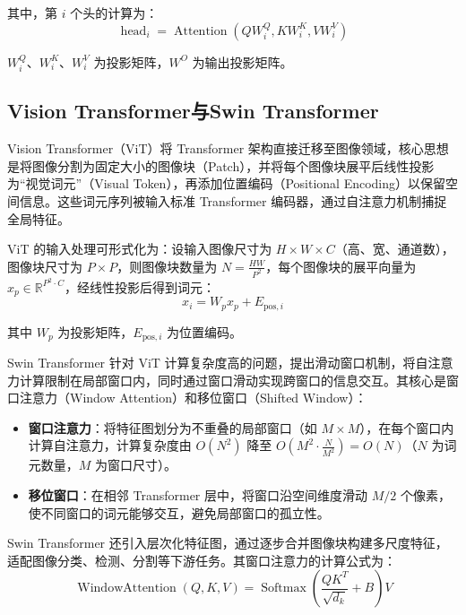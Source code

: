 \documentclass[twoside,openright]{xduugthesis}
\begin{document}
其中，第 $i$ 个头的计算为：
\begin{equation}
\operatorname{head}_{i} = \operatorname{Attention}(QW^{Q}_{i}, KW^{K}_{i}, VW^{V}_{i})
\end{equation}

$W^{Q}_{i}$、$W^{K}_{i}$、$W^{V}_{i}$ 为投影矩阵，$W^{O}$ 为输出投影矩阵。

\subsection{Vision Transformer与Swin Transformer}
Vision Transformer（ViT）将 Transformer 架构直接迁移至图像领域，核心思想是将图像分割为固定大小的图像块（Patch），并将每个图像块展平后线性投影为“视觉词元”（Visual Token），再添加位置编码（Positional Encoding）以保留空间信息。这些词元序列被输入标准 Transformer 编码器，通过自注意力机制捕捉全局特征。

ViT 的输入处理可形式化为：设输入图像尺寸为 $H \times W \times C$（高、宽、通道数），图像块尺寸为 $P \times P$，则图像块数量为 $N = \frac{HW}{P^2}$，每个图像块的展平向量为 $x_p \in \mathbb{R}^{P^2 \cdot C}$，经线性投影后得到词元：
\begin{equation}
    x_i = W_p x_p + E_{\text{pos},i}
\end{equation}

其中 $W_p$ 为投影矩阵，$E_{\text{pos},i}$ 为位置编码。

Swin Transformer 针对 ViT 计算复杂度高的问题，提出滑动窗口机制，将自注意力计算限制在局部窗口内，同时通过窗口滑动实现跨窗口的信息交互。其核心是窗口注意力（Window Attention）和移位窗口（Shifted Window）：

\begin{itemize}
    \item \textbf{窗口注意力}：将特征图划分为不重叠的局部窗口（如 $M \times M$），在每个窗口内计算自注意力，计算复杂度由 $O(N^2)$ 降至 $O(M^2 \cdot \frac{N}{M^2}) = O(N)$（$N$ 为词元数量，$M$ 为窗口尺寸）。
    \item \textbf{移位窗口}：在相邻 Transformer 层中，将窗口沿空间维度滑动 $M/2$ 个像素，使不同窗口的词元能够交互，避免局部窗口的孤立性。
\end{itemize}

Swin Transformer 还引入层次化特征图，通过逐步合并图像块构建多尺度特征，适配图像分类、检测、分割等下游任务。其窗口注意力的计算公式为：
\begin{equation}
    \operatorname{WindowAttention}(Q, K, V) = \operatorname{Softmax}\left(\frac{QK^T}{\sqrt{d_k}} + B\right) V
\end{equation}
\end{document}
